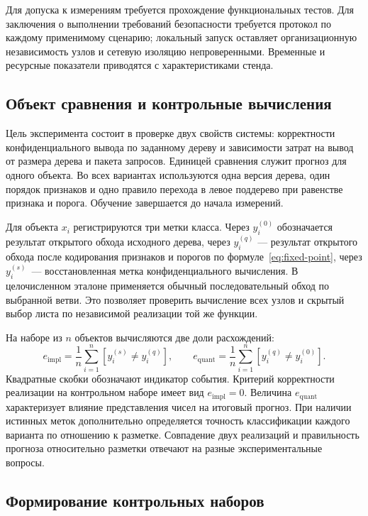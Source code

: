 Для допуска к измерениям требуется прохождение функциональных тестов. Для заключения о выполнении требований безопасности требуется протокол по каждому применимому сценарию; локальный запуск оставляет организационную независимость узлов и сетевую изоляцию непроверенными. Временные и ресурсные показатели приводятся с характеристиками стенда.

\subsection{Объект сравнения и контрольные вычисления}

Цель эксперимента состоит в проверке двух свойств системы: корректности
конфиденциального вывода по заданному дереву и зависимости затрат на вывод
от размера дерева и пакета запросов. Единицей сравнения служит прогноз для
одного объекта. Во всех вариантах используются одна версия дерева, один
порядок признаков и одно правило перехода в левое поддерево при равенстве
признака и порога. Обучение завершается до начала измерений.

Для объекта $x_i$ регистрируются три метки класса. Через $y_i^{(0)}$
обозначается результат открытого обхода исходного дерева, через $y_i^{(q)}$
--- результат открытого обхода после кодирования признаков и порогов
по формуле~\eqref{eq:fixed-point}, через $y_i^{(s)}$~--- восстановленная
метка конфиденциального вычисления. В целочисленном эталоне применяется
обычный последовательный обход по выбранной ветви. Это позволяет проверить
вычисление всех узлов и скрытый выбор листа по независимой реализации
той же функции.

На наборе из $n$ объектов вычисляются две доли расхождений:
\[
  e_{\mathrm{impl}}=\frac{1}{n}\sum_{i=1}^{n}
       [y_i^{(s)}\ne y_i^{(q)}], \qquad
  e_{\mathrm{quant}}=\frac{1}{n}\sum_{i=1}^{n}
       [y_i^{(q)}\ne y_i^{(0)}].
\]
Квадратные скобки обозначают индикатор события. Критерий корректности
реализации на контрольном наборе имеет вид $e_{\mathrm{impl}}=0$.
Величина $e_{\mathrm{quant}}$ характеризует влияние представления чисел
на итоговый прогноз. При наличии истинных меток дополнительно определяется
точность классификации каждого варианта по отношению к разметке. Совпадение
двух реализаций и правильность прогноза относительно разметки отвечают
на разные экспериментальные вопросы.

\subsection{Формирование контрольных наборов}

